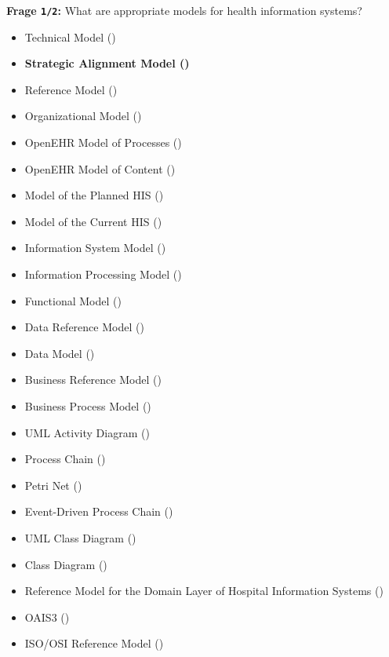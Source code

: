 \textbf{Frage \texttt{1/2}:} What are appropriate models for health information systems?

\begin{itemize}
  \item Technical Model ()
  \item \textbf{ Strategic Alignment Model ()}
  \item Reference Model ()
  \item Organizational Model ()
  \item OpenEHR Model of Processes ()
  \item OpenEHR Model of Content ()
  \item Model of the Planned HIS ()
  \item Model of the Current HIS ()
  \item Information System Model ()
  \item Information Processing Model ()
  \item Functional Model ()
  \item Data Reference Model ()
  \item Data Model ()
  \item Business Reference Model ()
  \item Business Process Model ()
  \item UML Activity Diagram ()
  \item Process Chain ()
  \item Petri Net ()
  \item Event-Driven Process Chain ()
  \item UML Class Diagram ()
  \item Class Diagram ()
  \item Reference Model for the Domain Layer of Hospital Information Systems ()
  \item OAIS3 ()
  \item ISO/OSI Reference Model ()

\end{itemize}
